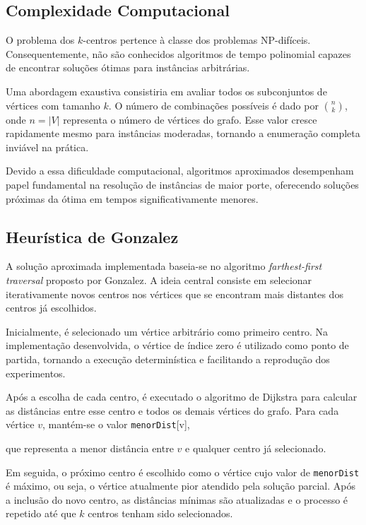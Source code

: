 \documentclass[12pt]{article}
\begin{document}
\subsection{Complexidade Computacional}

O problema dos $k$-centros pertence à classe dos problemas NP-difíceis. Consequentemente, não são conhecidos algoritmos de tempo polinomial capazes de encontrar soluções ótimas para instâncias arbitrárias.

Uma abordagem exaustiva consistiria em avaliar todos os subconjuntos de vértices com tamanho $k$. O número de combinações possíveis é dado por $\binom{n}{k}$, onde $n=|V|$ representa o número de vértices do grafo. Esse valor cresce rapidamente mesmo para instâncias moderadas, tornando a enumeração completa inviável na prática.

Devido a essa dificuldade computacional, algoritmos aproximados desempenham papel fundamental na resolução de instâncias de maior porte, oferecendo soluções próximas da ótima em tempos significativamente menores.

\subsection{Heurística de Gonzalez}

A solução aproximada implementada baseia-se no algoritmo \textit{farthest-first traversal} proposto por Gonzalez\cite{gonzalez1985}. A ideia central consiste em selecionar iterativamente novos centros nos vértices que se encontram mais distantes dos centros já escolhidos.

Inicialmente, é selecionado um vértice arbitrário como primeiro centro. Na implementação desenvolvida, o vértice de índice zero é utilizado como ponto de partida, tornando a execução determinística e facilitando a reprodução dos experimentos.

Após a escolha de cada centro, é executado o algoritmo de Dijkstra para calcular as distâncias entre esse centro e todos os demais vértices do grafo. Para cada vértice $v$, mantém-se o valor \texttt{menorDist}[v],

que representa a menor distância entre $v$ e qualquer centro já selecionado.

Em seguida, o próximo centro é escolhido como o vértice cujo valor de \texttt{menorDist} é máximo, ou seja, o vértice atualmente pior atendido pela solução parcial. Após a inclusão do novo centro, as distâncias mínimas são atualizadas e o processo é repetido até que $k$ centros tenham sido selecionados.
\end{document}
